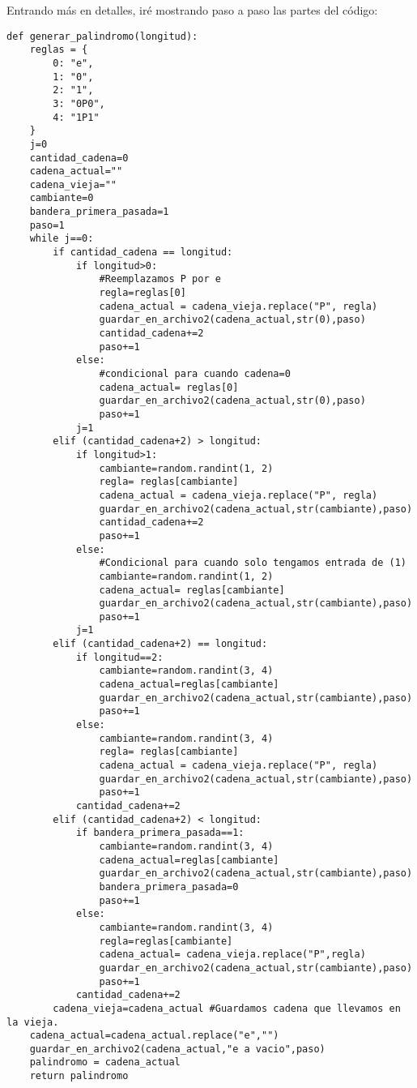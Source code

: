 Entrando más en detalles, iré mostrando paso a paso las partes del código:\newline
\newpage
\\
\begin{lstlisting}
def generar_palindromo(longitud):
    reglas = {
        0: "e",
        1: "0",
        2: "1",
        3: "0P0",
        4: "1P1"
    }
    j=0
    cantidad_cadena=0
    cadena_actual=""
    cadena_vieja=""
    cambiante=0
    bandera_primera_pasada=1
    paso=1
    while j==0:
        if cantidad_cadena == longitud:
            if longitud>0:
                #Reemplazamos P por e
                regla=reglas[0]
                cadena_actual = cadena_vieja.replace("P", regla)
                guardar_en_archivo2(cadena_actual,str(0),paso)
                cantidad_cadena+=2
                paso+=1
            else:
                #condicional para cuando cadena=0
                cadena_actual= reglas[0]
                guardar_en_archivo2(cadena_actual,str(0),paso)
                paso+=1
            j=1
        elif (cantidad_cadena+2) > longitud:
            if longitud>1:
                cambiante=random.randint(1, 2)
                regla= reglas[cambiante] 
                cadena_actual = cadena_vieja.replace("P", regla)
                guardar_en_archivo2(cadena_actual,str(cambiante),paso)
                cantidad_cadena+=2
                paso+=1
            else:
                #Condicional para cuando solo tengamos entrada de (1)
                cambiante=random.randint(1, 2)
                cadena_actual= reglas[cambiante]
                guardar_en_archivo2(cadena_actual,str(cambiante),paso)
                paso+=1
            j=1
        elif (cantidad_cadena+2) == longitud:
            if longitud==2:
                cambiante=random.randint(3, 4)
                cadena_actual=reglas[cambiante]
                guardar_en_archivo2(cadena_actual,str(cambiante),paso)
                paso+=1
            else:
                cambiante=random.randint(3, 4)
                regla= reglas[cambiante]
                cadena_actual = cadena_vieja.replace("P", regla)
                guardar_en_archivo2(cadena_actual,str(cambiante),paso)
                paso+=1
            cantidad_cadena+=2
        elif (cantidad_cadena+2) < longitud:
            if bandera_primera_pasada==1:
                cambiante=random.randint(3, 4)
                cadena_actual=reglas[cambiante]
                guardar_en_archivo2(cadena_actual,str(cambiante),paso)
                bandera_primera_pasada=0
                paso+=1
            else:
                cambiante=random.randint(3, 4)
                regla=reglas[cambiante]
                cadena_actual= cadena_vieja.replace("P",regla)
                guardar_en_archivo2(cadena_actual,str(cambiante),paso)
                paso+=1
            cantidad_cadena+=2
        cadena_vieja=cadena_actual #Guardamos cadena que llevamos en la vieja.
    cadena_actual=cadena_actual.replace("e","")
    guardar_en_archivo2(cadena_actual,"e a vacio",paso)
    palindromo = cadena_actual
    return palindromo

\end{lstlisting}


